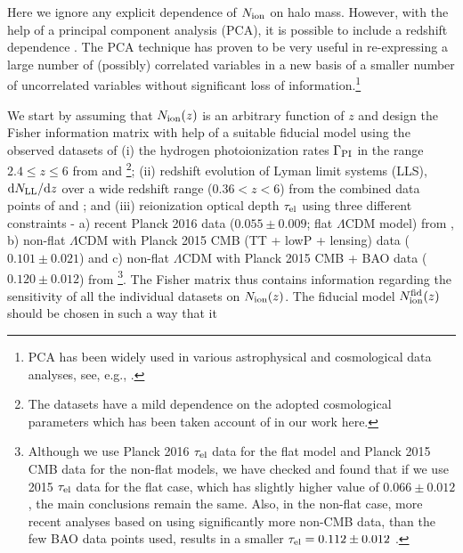 \documentclass[useAMS,usenatbib]{mnras}
\newcommand{\de}{{\rm d}}
\begin{document}
Here we ignore any explicit dependence of $N_{\rm ion}$ on halo mass. However,
with the help of a principal component analysis (PCA), it is possible to 
include a redshift dependence \citep{mitra1,mitra2,mitra4}. The PCA technique 
has proven to be very useful in re-expressing a large number of (possibly) 
correlated variables in a new basis of a smaller number of uncorrelated 
variables without significant loss of information.\footnote{PCA has been 
widely used in various astrophysical and cosmological data analyses,
see, e.g., \cite{1999MNRAS.304...75E,2002MNRAS.332..193E,2003PhRvD..68b3001H,
2003PhRvL..90c1301H,2006MNRAS.372..646L,2008ApJ...672..737M,2010PhRvL.104u1301C,
2011A&A...527A..49I,2012MNRAS.421.3570G,2015PhRvD..91f3514M}.}

We start by assuming that $N_{\rm ion} (z)$ is an arbitrary function of $z$ and 
design the Fisher information matrix with help of a suitable fiducial model 
using the observed datasets of
 (i) the hydrogen photoionization rates $\Gamma_{\rm PI}$ in the range $2.4\leqslant z\leqslant6$ from
 \cite{2011MNRAS.412.1926W} and \cite{2013MNRAS.436.1023B}\footnote{The datasets have
 a mild dependence on the adopted cosmological parameters which has been taken account of in
 our work here.};
 (ii) redshift evolution of Lyman limit systems (LLS), $\de N_{\rm LL}/\de z$ over a wide
 redshift range ($0.36 < z < 6$) from the combined data points of \cite{2010ApJ...721.1448S}
 and \cite{2010ApJ...718..392P}; and
 (iii) reionization optical depth $\tau_{\rm el}$ using three different constraints -
 a) recent Planck 2016 data ($0.055\pm0.009$; flat $\Lambda$CDM model) from \cite{2016A&A...596A.107P},
 b) non-flat $\Lambda$CDM with Planck 2015 CMB (TT + lowP + lensing) data ($0.101\pm0.021$)
 and c) non-flat $\Lambda$CDM with Planck 2015 CMB + BAO data ($0.120\pm0.012$) from
 \cite{2017arXiv170703452O}\footnote{Although we use Planck 2016
 $\tau_{\rm el}$ data for the flat model and Planck 2015 CMB data for the non-flat models,
 we have checked and found that if we use 2015 $\tau_{\rm el}$ data for the flat case, which
 has slightly higher  value of $0.066\pm0.012$, the main conclusions remain the same.
 Also, in the non-flat case, more recent analyses based on using significantly
 more non-CMB data, than the few BAO data points \cite{2017arXiv170703452O} used,
 results in a smaller $\tau_{\rm el} = 0.112 \pm 0.012$ \citep{2018arXiv180100213P,2018arXiv180305522P}.}.
 The Fisher matrix thus contains information 
regarding the sensitivity of all the individual datasets on $N_{\rm ion}(z)$.
The fiducial model $N_{\rm ion}^{\rm fid} (z)$ should be chosen in such a way that it
\end{document}
